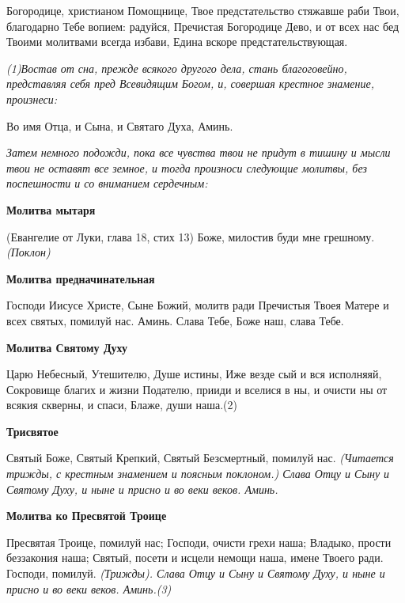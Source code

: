 Богородице, христианом Помощнице, Твое предстательство стяжавше раби Твои, благодарно Тебе вопием: радуйся, Пречистая Богородице Дево, и от всех нас бед Твоими молитвами всегда избави, Едина вскоре предстательствующая.


\mychapterending

 
\itshape (1)Востав от сна, прежде всякого другого дела, стань благоговейно, представляя себя пред Всевидящим Богом, и, совершая крестное знамение, произнеси:\normalfont{}


\medskip
Во имя Отца, и Сына, и Святаго Духа, Аминь.




\medskip
\itshape Затем немного подожди, пока все чувства твои не придут в тишину и мысли твои не оставят все земное, и тогда произноси следующие молитвы, без поспешности и со вниманием сердечным:\normalfont{}


\medskip


\bfseries Молитва мытаря\normalfont{}\itshape 


(Евангелие от Луки, глава 18, стих 13) 
\normalfont{}
Боже, милостив буди мне грешному. \itshape (Поклон)\normalfont{}


\medskip
\bfseries Молитва предначинательная\normalfont{}


Господи Иисусе Христе, Сыне Божий, молитв ради Пречистыя Твоея Матере и всех святых, помилуй нас. Аминь.
Слава Тебе, Боже наш, слава Тебе.




\medskip
\bfseries Молитва Святому Духу\normalfont{}


Царю Небесный, Утешителю, Душе истины, Иже везде сый и вся исполняяй, Сокровище благих и жизни Подателю, прииди и вселися в ны, и очисти ны от всякия скверны, и спаси, Блаже, души наша.(2) 


\medskip
\bfseries Трисвятое\normalfont{}


Святый Боже, Святый Крепкий, Святый Безсмертный, помилуй нас. \itshape (Читается трижды, с крестным знамением и поясным поклоном.) \normalfont{}
Слава Отцу и Сыну и Святому Духу, и ныне и присно и во веки веков. Аминь.




\medskip
\bfseries Молитва ко Пресвятой Троице\normalfont{}


Пресвятая Троице, помилуй нас; Господи, очисти грехи наша; Владыко, прости беззакония наша; Святый, посети и исцели немощи наша, имене Твоего ради.
Господи, помилуй. \itshape (Трижды)\normalfont{}. Слава Отцу и Сыну и Святому Духу, и ныне и присно и во веки веков. Аминь.\itshape (3)\normalfont{}


